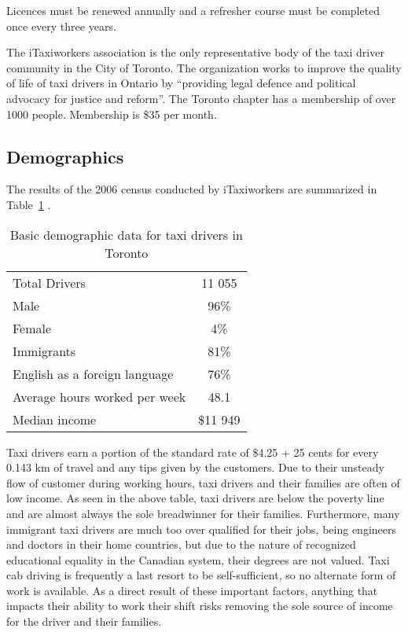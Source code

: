 \documentclass[11pt]{article}
\begin{document}
Licences must be renewed annually %
and a refresher course must be completed once every three years\cite{MLSChp545}.

The iTaxiworkers association is the only representative body of the taxi driver community in the City of Toronto. 
The organization works to improve the quality of life of taxi drivers in Ontario by ``providing legal defence
and political advocacy for justice and reform''\cite{iTaxiWorkers2012}. The Toronto chapter
has a membership of over 1000 people. Membership is \$35 per month\cite{iTaxi2012, Abdiemail}.

\subsection{Demographics}
The results of the 2006 census conducted by iTaxiworkers are summarized in Table~\ref{tab:demographics} \cite{iTaxiWorkers2012}.
\begin{table}[h!]
\centering
\caption{Basic demographic data for taxi drivers in Toronto}
\label{tab:demographics}
\begin{tabular}{l c}
 Total Drivers & 11 055 \\
 Male & 96\% \\
 Female & 4\% \\
 Immigrants & 81\% \\
 English as a foreign language & 76\% \\
 Average hours worked per week & 48.1 \\
 Median income & \$11 949 \\
\end{tabular}
\end{table}

Taxi drivers earn a portion of the standard rate of \$4.25 + 25 cents for every 0.143 km of 
travel\cite{thestar2012} and any tips given by the customers. Due to their unsteady flow of 
customer during working hours, taxi drivers and their families are
often of low income. As seen in the above table, taxi drivers
are below the poverty line and are almost always the sole breadwinner
for their families\cite{Abdiphone}. Furthermore, many immigrant taxi
drivers are much too over qualified for their jobs, being engineers
and doctors in their home countries, but due to the nature of
recognized educational equality in the Canadian system, their degrees
are not valued\cite{Abdiphone}. Taxi cab driving is frequently a last
resort to be self-sufficient, so no alternate form of work is available. As a direct result of these important factors,
anything that impacts their ability to work their shift risks removing
the sole source of income for the driver and their families. 
\end{document}
